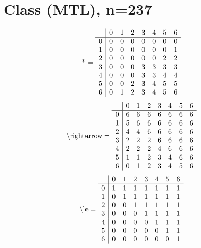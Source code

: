 \documentclass[11pt]{article}
\begin{document}
\section{Class (MTL), n=237}
\[\text{*} = 
\begin{array}{r | r r r r r r r}
 & 0 & 1 & 2 & 3 & 4 & 5 & 6 \\ \hline
0 & 0 & 0 & 0 & 0 & 0 & 0 & 0 \\
1 & 0 & 0 & 0 & 0 & 0 & 0 & 1 \\
2 & 0 & 0 & 0 & 0 & 0 & 2 & 2 \\
3 & 0 & 0 & 0 & 3 & 3 & 3 & 3 \\
4 & 0 & 0 & 0 & 3 & 3 & 4 & 4 \\
5 & 0 & 0 & 2 & 3 & 4 & 5 & 5 \\
6 & 0 & 1 & 2 & 3 & 4 & 5 & 6 \\
\end{array}
\]
\[\text{\textbackslash rightarrow} = 
\begin{array}{r | r r r r r r r}
 & 0 & 1 & 2 & 3 & 4 & 5 & 6 \\ \hline
0 & 6 & 6 & 6 & 6 & 6 & 6 & 6 \\
1 & 5 & 6 & 6 & 6 & 6 & 6 & 6 \\
2 & 4 & 4 & 6 & 6 & 6 & 6 & 6 \\
3 & 2 & 2 & 2 & 6 & 6 & 6 & 6 \\
4 & 2 & 2 & 2 & 4 & 6 & 6 & 6 \\
5 & 1 & 1 & 2 & 3 & 4 & 6 & 6 \\
6 & 0 & 1 & 2 & 3 & 4 & 5 & 6 \\
\end{array}
\]
\[\text{\textbackslash le} = 
\begin{array}{r | r r r r r r r}
 & 0 & 1 & 2 & 3 & 4 & 5 & 6 \\ \hline
0 & 1 & 1 & 1 & 1 & 1 & 1 & 1 \\
1 & 0 & 1 & 1 & 1 & 1 & 1 & 1 \\
2 & 0 & 0 & 1 & 1 & 1 & 1 & 1 \\
3 & 0 & 0 & 0 & 1 & 1 & 1 & 1 \\
4 & 0 & 0 & 0 & 0 & 1 & 1 & 1 \\
5 & 0 & 0 & 0 & 0 & 0 & 1 & 1 \\
6 & 0 & 0 & 0 & 0 & 0 & 0 & 1 \\
\end{array}
\]
\end{document}
